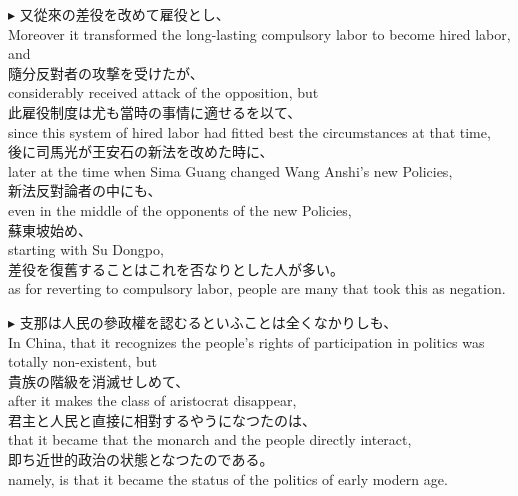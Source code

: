 \documentclass{ctexart}
\makeatletter
\newcommand*{\shifttext}[1]{%
  \settowidth{\@tempdima}{#1}%
  \hspace{-\@tempdima}#1%
}
\newcommand{\plabel}[1]{%
\shifttext{\textbf{#1}\quad}%
}
\makeatother
\begin{document}
\vspace{1em}
\plabel{$\blacktriangleright$}%
又從來の差役を改めて雇役とし、\\
Moreover it transformed the long-lasting compulsory labor to become hired labor, and\\
隨分反對者の攻撃を受けたが、\\
considerably received attack of the opposition, but\\
此雇役制度は尤も當時の事情に適せるを以て、\\
since this system of hired labor had fitted best the circumstances at that time,\\
後に司馬光が王安石の新法を改めた時に、\\
later at the time when Sima Guang changed Wang Anshi's new Policies,\\
新法反對論者の中にも、\\
even in the middle of the opponents of the new Policies,\\
蘇東坡始め、\\
starting with Su Dongpo,\\
差役を復舊することはこれを否なりとした人が多い。\\
as for reverting to compulsory labor, people are many that took this as negation.

\vspace{1em}
\plabel{$\blacktriangleright$}%
支那は人民の參政權を認むるといふことは全くなかりしも、\\
In China, that it recognizes the people's rights of participation in politics was totally non-existent, but\\
貴族の階級を消滅せしめて、\\
after it makes the class of aristocrat disappear,\\
君主と人民と直接に相對するやうになつたのは、\\
that it became that the monarch and the people directly interact,\\
即ち近世的政治の状態となつたのである。\\
namely, is that it became the status of the politics of early modern age.
\end{document}
